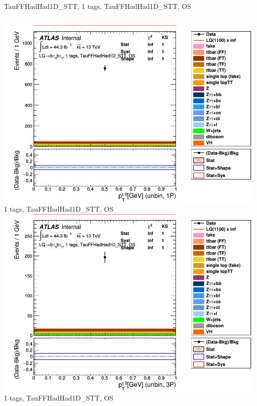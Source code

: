 \begin{frame}{TauFFHadHad1D\_STT, 1 tags, TauFFHadHad1D\_STT, OS}
\begin{columns}[c]
    \centering\includegraphics[width=\textwidth]{C_1tag2pjet_0ptv_OS_UnbinLeadTau1P}\\
    1 tags, TauFFHadHad1D\_STT, OS
    \centering\includegraphics[width=\textwidth]{C_1tag2pjet_0ptv_OS_UnbinLeadTau3P}\\
    1 tags, TauFFHadHad1D\_STT, OS
  \end{columns}
\end{frame}

